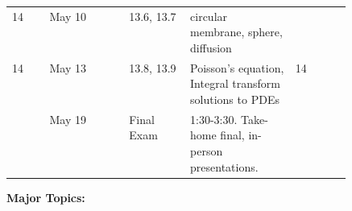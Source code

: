 \documentclass[12pt]{article}
\begin{document}
{\begin{table}[h]
\begin{tabular}{l|l|p{0.18\linewidth}|p{0.31\linewidth}|l|l}
14             & May 10       & 13.6, 13.7 & circular membrane, sphere, diffusion &  &                  \\ 
14             & May 13       & 13.8, 13.9 & Poisson's equation, Integral transform solutions to PDEs & 14 &                 \\ \hline \hline
              & May  19      & Final Exam & 1:30-3:30. Take-home final, in-person presentations.  &                      &                   \\ 
\end{tabular}
\end{table}


\newpage

\noindent \textbf{Major Topics:} 

}
\end{document}
